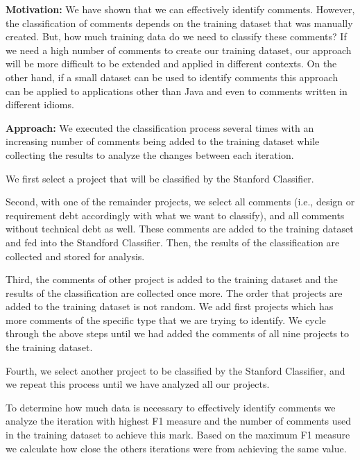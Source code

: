 \vspace{3mm}
\noindent\rqiii
\vspace{3mm}

\noindent \textbf{Motivation:} We have shown that we can effectively identify \SATD comments. However, the classification of \SATD comments depends on the training dataset that was manually created. But, how much training data do we need to classify these comments? If we need a high number of comments to create our training dataset, our approach will be more difficult to be extended and applied in different contexts. On the other hand, if a small dataset can be used to identify \SATD comments this approach can be applied to applications other than Java and even to comments written in different idioms. 

\vspace{1mm}
\noindent \textbf{Approach:} We executed the classification process several times with an increasing number of comments being added to the training dataset while collecting the results to analyze the changes between each iteration.

We first select a project that will be classified by the Stanford Classifier.

Second, with one of the remainder projects, we select all \SATD comments (i.e., design or requirement debt accordingly with what we want to classify), and all comments without technical debt as well. These comments are added to the training dataset and fed into the Standford Classifier. Then, the results of the classification are collected and stored for analysis.

Third, the comments of other project is added to the training dataset and the results of the classification are collected once more. The order that projects are added to the training dataset is not random. We add first projects which has more \SATD comments of the specific type that we are trying to identify. We cycle through the above steps until we had added the comments of all nine projects to the training dataset.

Fourth, we select another project to be classified by the Stanford Classifier, and we repeat this process until we have analyzed all our projects.
 
To determine how much data is necessary to effectively identify \SATD comments we analyze the iteration with highest F1 measure and the number of comments used in the training dataset to achieve this mark. Based on the maximum F1 measure we calculate how close the others iterations were from achieving the same value.

